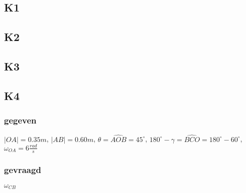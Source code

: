 \documentclass[10pt,a4paper]{article}
\begin{document}
\subsection{K1}

\subsection{K2}

\subsection{K3}

\subsection{K4}
\subsubsection*{gegeven}
$|OA|=0.35m$, $|AB| = 0.60m$, $\theta = \hat{AOB} = 45^\circ$, $180^\circ-\gamma = \hat{BCO} = 180^\circ-60^\circ$, $\omega_{OA} = 6\frac{rad}{s}$
\subsubsection*{gevraagd}
$\omega_{CB}$
\end{document}

